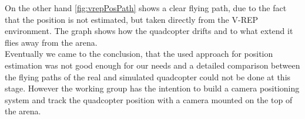 On the other hand \ref{fig:vrepPosPath} shows a clear flying path, due to the fact that the position is not estimated, but taken directly from the V-REP environment. 
The graph shows how the quadcopter drifts and to what extend it flies away from the arena.\\

Eventually we came to the conclusion, that the used approach for position estimation was not good enough for our needs and a detailed comparison between the flying paths of the real and simulated quadcopter could not be done at this stage. 
However the working group has the intention to build a camera positioning system and track the quadcopter position with a camera mounted on the top of the arena.


